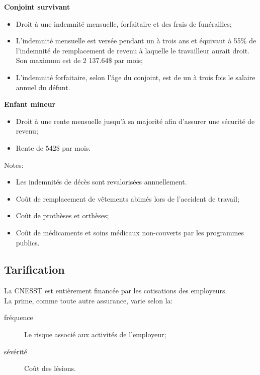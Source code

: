 \documentclass[10pt, french]{article}
\begin{document}
\begin{multicols*}{3}
\begin{definitionNOHFILL}
\textbf{Conjoint survivant}
\begin{itemize}[leftmargin = *]
	\item	Droit à une indemnité mensuelle, forfaitaire et des frais de funérailles;
	\item	L'indemnité mensuelle est versée pendant un à trois ans et équivaut à 55\% de l'indemnité de remplacement de revenu à laquelle le travailleur aurait droit.\\
			Son maximum est de 2 137.64\$ par mois;
	\item	L'indemnité forfaitaire, selon l'âge du conjoint, est de un à trois fois le salaire annuel du défunt.
\end{itemize}

\textbf{Enfant mineur}
\begin{itemize}[leftmargin = *]
	\item	Droit à une rente mensuelle jusqu'à sa majorité afin d'assurer une sécurité de revenu;
	\item	Rente de 542\$ par mois.
\end{itemize}

Notes:
\begin{itemize}
	\item	Les indemnités de décès sont revalorisées annuellement.
\end{itemize}
\end{definitionNOHFILL}

\begin{definitionNOHFILL}
\begin{itemize}[leftmargin = *]
	\item	Coût de remplacement de vêtements abimés lors de l'accident de travail;
	\item	Coût de prothèses et orthèses;
	\item	Coût de médicaments et soins médicaux non-couverts par les programmes publics.
\end{itemize}
\end{definitionNOHFILL}

\subsection*{Tarification}
La CNESST est entièrement financée par les cotisations des employeurs.\\

La prime, comme toute autre assurance, varie selon la:
\begin{description}
	\item[fréquence]	Le risque associé aux activités de l'employeur;
	\item[sévérité]	Coût des lésions.
\end{description}


\end{multicols*}
\end{document}
